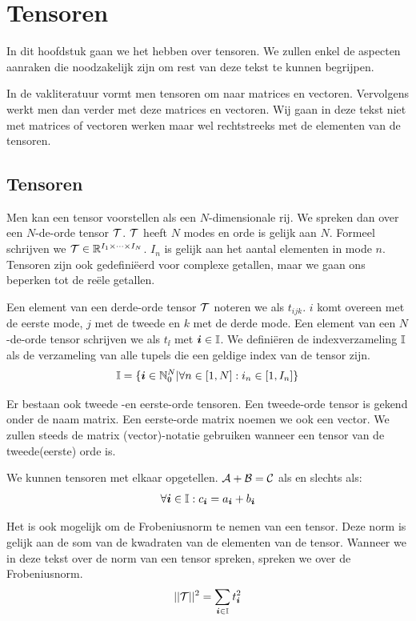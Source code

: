 \chapter{Tensoren}
\label{h:tensoren}
In dit hoofdstuk gaan we het hebben over tensoren. We zullen enkel de aspecten aanraken die noodzakelijk zijn om rest van deze tekst te kunnen begrijpen.

In de vakliteratuur vormt men tensoren om naar matrices en vectoren. Vervolgens werkt men dan verder met deze matrices en vectoren. Wij gaan in deze tekst niet met matrices of vectoren werken maar wel rechtstreeks met de elementen van de tensoren. 


\section{Tensoren}
Men kan een tensor voorstellen als een $N$-dimensionale rij. We spreken dan over een $N$-de-orde tensor $\mathcal{T}$. $\mathcal{T}$ heeft $N$ modes en orde is gelijk aan $N$. Formeel schrijven we $\mathcal{T} \in \mathbb{R}^{I_1 \times \dotsb \times I_N}$. $I_n$ is gelijk aan het aantal elementen in mode $n$. Tensoren zijn ook gedefini\"eerd voor complexe getallen, maar we gaan ons beperken tot de re\"ele getallen.

Een element van een derde-orde tensor $\mathcal{T}$ noteren we als $t_{ijk}$. $i$ komt overeen met de eerste mode, $j$ met de tweede en $k$ met de derde mode. Een element van een $N$-de-orde tensor schrijven we als $t_{\ii{}}$ met $\boldsymbol{i}{} \in \mathbb{I}$. We defini\"eren de indexverzameling $\mathbb{I}$ als de verzameling van alle tupels die een geldige index van de tensor zijn.
\[
    \mathbb{I} = \{\boldsymbol{i}{} \in \mathbb{N}_0^N | \forall n \in [1, N]: i_n \in [1, I_n]\}
\]


Er bestaan ook tweede -en eerste-orde tensoren. Een tweede-orde tensor is gekend onder de naam matrix. Een eerste-orde matrix noemen we ook een vector. We zullen steeds de matrix (vector)-notatie gebruiken wanneer een tensor van de tweede(eerste) orde is.

We kunnen tensoren met elkaar opgetellen. $\mathcal{A} + \mathcal{B} = \mathcal{C}$ als en slechts als:
\[
	\forall \boldsymbol{i}{} \in \mathbb{I}: c_{\boldsymbol{i}{}} = a_{\boldsymbol{i}{}} + b_{\boldsymbol{i}{}}
\]

Het is ook mogelijk om de Frobeniusnorm te nemen van een tensor. Deze norm is gelijk aan de som van de kwadraten van de elementen van de tensor. Wanneer we in deze tekst over de norm van een tensor spreken, spreken we over de Frobeniusnorm.
\[
	||\mathcal{T}||^2 = \sum_{\boldsymbol{i}{} \in \mathbb{I}} t_{\boldsymbol{i}{}}^2
\]

